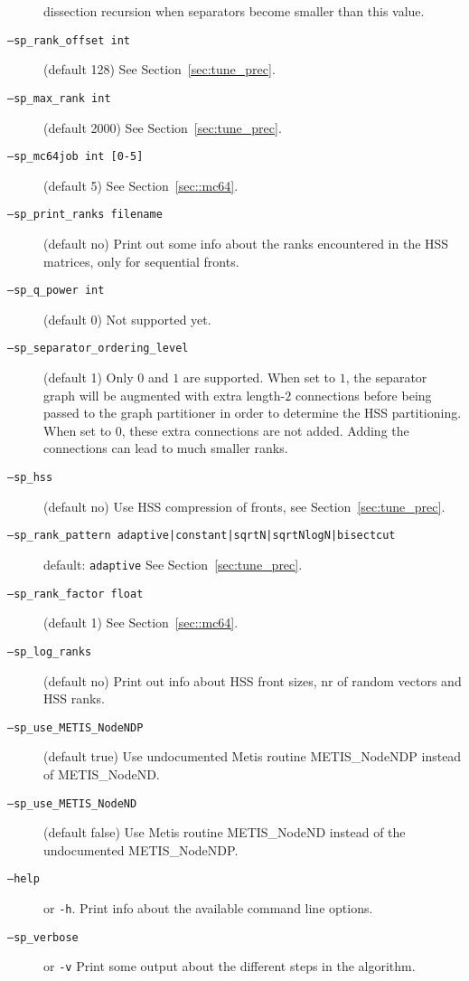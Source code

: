 \documentclass{article}
\begin{document}
\begin{description}
  dissection recursion when separators become smaller than this value.
\item[\texttt{---sp\_rank\_offset int}] (default 128) See
  Section~\ref{sec:tune_prec}.
\item[\texttt{---sp\_max\_rank int}] (default 2000) See
  Section~\ref{sec:tune_prec}.
\item[\texttt{---sp\_mc64job int [0-5]}] (default 5) See
  Section~\ref{sec::mc64}.
\item[\texttt{---sp\_print\_ranks filename}] (default no) Print out
  some info about the ranks encountered in the HSS matrices, only for
  sequential fronts.
\item[\texttt{---sp\_q\_power int}] (default 0) Not supported yet.
\item[\texttt{---sp\_separator\_ordering\_level}] (default 1) Only $0$
  and $1$ are supported. When set to $1$, the separator graph will be
  augmented with extra length-$2$ connections before being passed to
  the graph partitioner in order to determine the HSS
  partitioning. When set to $0$, these extra connections are not
  added. Adding the connections can lead to much smaller ranks.
\item[\texttt{---sp\_hss}] (default no) Use HSS compression of fronts,
  see Section~\ref{sec:tune_prec}.
\item[\texttt{---sp\_rank\_pattern
    adaptive|constant|sqrtN|sqrtNlogN|bisectcut}] default:
  \lstinline[style=Bash]!adaptive! See Section~\ref{sec:tune_prec}.
\item[\texttt{---sp\_rank\_factor float}] (default 1) See
  Section~\ref{sec::mc64}.
\item[\texttt{---sp\_log\_ranks}] (default no) Print out info about
  HSS front sizes, nr of random vectors and HSS ranks.
\item[\texttt{--sp\_use\_METIS\_NodeNDP}] (default true) Use
  undocumented Metis routine METIS\_NodeNDP instead of METIS\_NodeND.
\item[\texttt{--sp\_use\_METIS\_NodeND}] (default false) Use Metis
  routine METIS\_NodeND instead of the undocumented METIS\_NodeNDP.
\item[\texttt{---help}] or \lstinline[style=Bash]!-h!. Print info
  about the available command line options.
\item[\texttt{---sp\_verbose}] or \lstinline[style=Bash]!-v! Print
  some output about the different steps in the algorithm.

\end{description}
\end{document}
